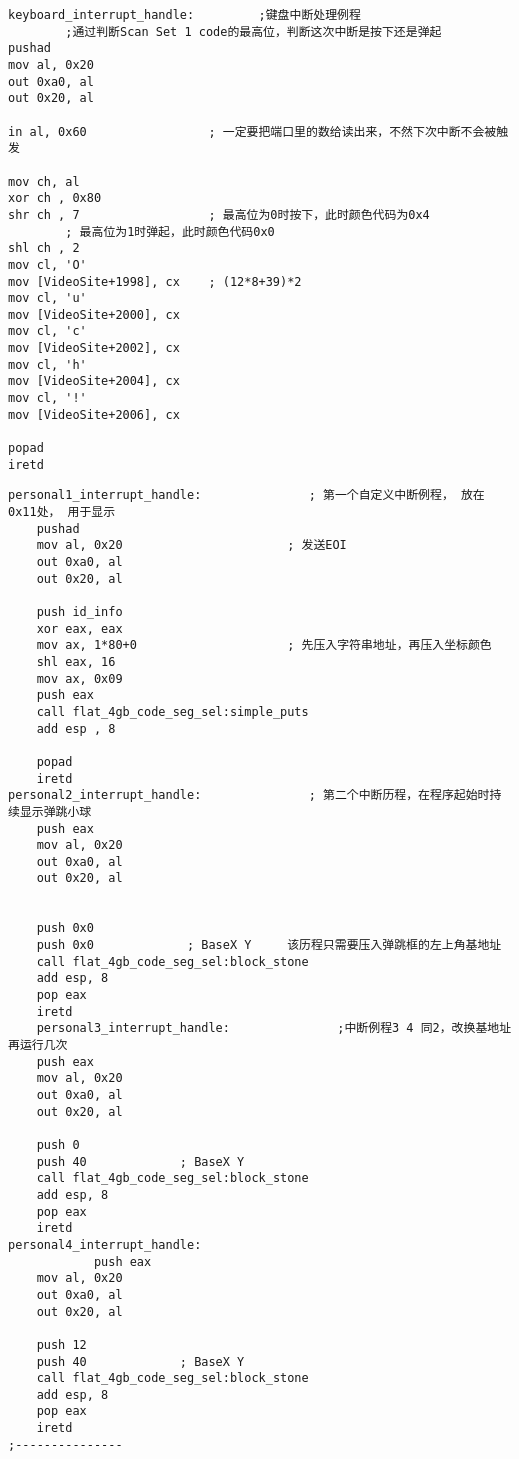 \documentclass[a4paper,11pt,UTF8]{ctexart}
\begin{document}
	\begin{lstlisting}[caption={键盘中断处理例程},tabsize=4,basicstyle=\footnotesize,captionpos=b]
		keyboard_interrupt_handle:         ;键盘中断处理例程
		;通过判断Scan Set 1 code的最高位，判断这次中断是按下还是弹起
pushad
mov al, 0x20
out 0xa0, al
out 0x20, al

in al, 0x60                 ; 一定要把端口里的数给读出来，不然下次中断不会被触发

mov ch, al
xor ch , 0x80
shr ch , 7                  ; 最高位为0时按下，此时颜色代码为0x4
		; 最高位为1时弹起，此时颜色代码0x0
shl ch , 2
mov cl, 'O'
mov [VideoSite+1998], cx    ; (12*8+39)*2
mov cl, 'u'
mov [VideoSite+2000], cx
mov cl, 'c'
mov [VideoSite+2002], cx
mov cl, 'h'
mov [VideoSite+2004], cx
mov cl, '!'
mov [VideoSite+2006], cx

popad
iretd
	\end{lstlisting}

	\begin{lstlisting}[caption={四个软中断例程},tabsize=4,basicstyle=\footnotesize,captionpos=b]
personal1_interrupt_handle:               ; 第一个自定义中断例程， 放在0x11处， 用于显示
	pushad
	mov al, 0x20                       ; 发送EOI
	out 0xa0, al
	out 0x20, al
	
	push id_info
	xor eax, eax
	mov ax, 1*80+0                     ; 先压入字符串地址，再压入坐标颜色
	shl eax, 16
	mov ax, 0x09
	push eax
	call flat_4gb_code_seg_sel:simple_puts
	add esp , 8

	popad
	iretd
personal2_interrupt_handle:               ; 第二个中断历程，在程序起始时持续显示弹跳小球
	push eax
	mov al, 0x20
	out 0xa0, al
	out 0x20, al


	push 0x0             
	push 0x0             ; BaseX Y     该历程只需要压入弹跳框的左上角基地址
	call flat_4gb_code_seg_sel:block_stone
	add esp, 8
	pop eax
	iretd
	personal3_interrupt_handle:               ;中断例程3 4 同2，改换基地址再运行几次
	push eax
	mov al, 0x20
	out 0xa0, al
	out 0x20, al

	push 0             
	push 40             ; BaseX Y
	call flat_4gb_code_seg_sel:block_stone
	add esp, 8
	pop eax
	iretd
personal4_interrupt_handle:
			push eax
	mov al, 0x20
	out 0xa0, al
	out 0x20, al

	push 12             
	push 40             ; BaseX Y
	call flat_4gb_code_seg_sel:block_stone
	add esp, 8
	pop eax
	iretd
;---------------
\end{lstlisting}
\end{document}
